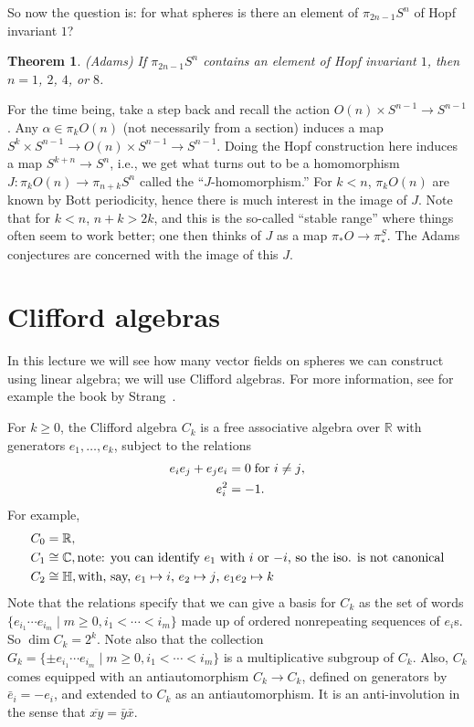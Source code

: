 \documentclass{article}
\newcommand{\OutputCliffordAlgebras}{}
\newcommand{\C}{\mathbb{C}}
\newcommand{\R}{\mathbb{R}}
\newtheorem{thm}{Theorem}[section]
\begin{document}
So now the question is: for what spheres is there an element of $\pi_{2n-1} S^n$ of Hopf invariant $1$?
\begin{thm}(Adams) %
If $\pi_{2n-1} S^n$ contains an element of Hopf invariant $1$, then $n = 1$, $2$, $4$, or $8$.
\end{thm}
For the time being, take a step back and recall the action $O(n) \times S^{n-1} \to S^{n-1}$.  Any $\alpha \in \pi_k O(n)$ (not necessarily from a section) induces a map $S^k \times S^{n-1} \to O(n) \times S^{n-1} \to S^{n-1}$.  Doing the Hopf construction here induces a map $S^{k+n} \to S^n$, i.e., we get what turns out to be a homomorphism $J: \pi_k O(n) \to \pi_{n+k} S^n$ called the ``$J$-homomorphism.''  For $k < n$, $\pi_k O(n)$ are known by Bott periodicity, hence there is much interest in the image of $J$.  Note that for $k < n$, $n + k > 2k$, and this is the so-called ``stable range'' where things often seem to work better; one then thinks of $J$ as a map $\pi_* O \to \pi_*^S$.  The Adams conjectures are concerned with the image of this $J$. %

\fi
\section{Clifford algebras} %
\ifx\OutputCliffordAlgebras\undefined\else

In this lecture we will see how many vector fields on spheres we can construct using linear algebra; we will use Clifford algebras.  For more information, see for example the book by Strang~\cite{Strang}.

For $k \ge 0$, the Clifford algebra $C_k$ is a free associative algebra over $\R$ with generators $e_1, \ldots, e_k$, subject to the relations
\begin{align*}
e_i e_j + e_j e_i & = 0 \hbox{\;for $i \ne j$}, \\
e_i^2 & = -1.
\end{align*}
For example,
\begin{align*}
C_0 & = \R, \\
C_1 & \cong \C, \hbox{note: you can identify $e_1$ with $i$ or $-i$, so the iso. is not canonical} \\
C_2 & \cong \mathbb{H}, \hbox{with, say, $e_1 \mapsto i$, $e_2 \mapsto j$, $e_1 e_2 \mapsto k$}
\end{align*}
Note that the relations specify that we can give a basis for $C_k$ as the set of words $\{e_{i_1} \cdots e_{i_m} \mid m \ge 0, i_1 < \cdots < i_m\}$ made up of ordered nonrepeating sequences of $e_i$s.  So $\dim C_k = 2^k$.  Note also that the collection $G_k = \{ \pm e_{i_1} \cdots e_{i_m} \mid m \ge 0, i_1 < \cdots < i_m\}$ is a multiplicative subgroup of $C_k$.  Also, $C_k$ comes equipped with an antiautomorphism $C_k \to C_k$, defined on generators by $\bar e_i = -e_i$, and extended to $C_k$ as an antiautomorphism.  It is an anti-involution in the sense that $\overline{xy} = \bar y \bar x$.
\end{document}
